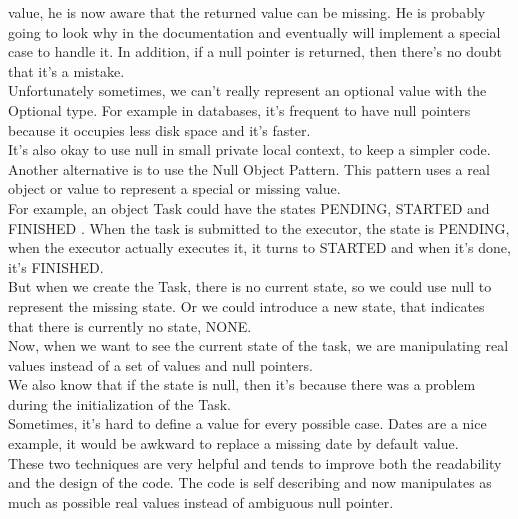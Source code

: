 value, he is now aware that the returned value can be missing.
He is probably going to look why in the documentation and eventually
will implement a special case to handle it.
In addition, if a null pointer is returned, then there's no doubt that
it's a mistake. \\
Unfortunately sometimes, we can't really represent an optional value
with the Optional type.
For example in databases, it's frequent to have null pointers because
it occupies less disk space and it's faster. \\
It's also okay to use null in small private local context, to keep a
simpler code.\\
\newline
Another alternative is to use the Null Object Pattern.
This pattern uses a real object or value to represent a special or
missing value. \\
For example, an object Task could have the states PENDING, STARTED
and FINISHED .
When the task is submitted to the executor, the state is PENDING,
when the executor actually executes it, it turns to STARTED and when
it's done, it's FINISHED. \\
But when we create the Task, there is no current state, so we could use
null to represent the missing state.
Or we could introduce a new state, that indicates that there is currently
no state, NONE. \\
Now, when we want to see the current state of the task, we are
manipulating real values instead of a set of values and null pointers. \\
We also know that if the state is null, then it's because there was
a problem during the initialization of the Task. \\
Sometimes, it's hard to define a value for every possible case.
Dates are a nice example, it would be awkward to replace a missing date
by default value. \\
\newline
These two techniques are very helpful and tends to improve both the
readability and the design of the code.
The code is self describing and now manipulates as much as possible
real values instead of ambiguous null pointer.

